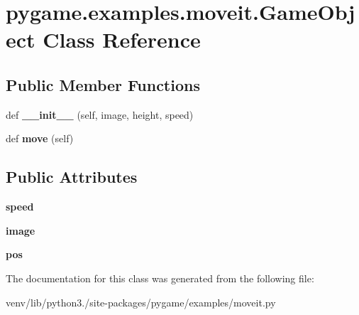 \hypertarget{classpygame_1_1examples_1_1moveit_1_1_game_object}{}\section{pygame.\+examples.\+moveit.\+Game\+Object Class Reference}
\label{classpygame_1_1examples_1_1moveit_1_1_game_object}
\subsection*{Public Member Functions}
\begin{DoxyCompactItemize}
\item 
\mbox{\label{classpygame_1_1examples_1_1moveit_1_1_game_object_a068fddaf4706a94b006340b060223c04}} 
def {\bfseries \+\_\+\+\_\+init\+\_\+\+\_\+} (self, image, height, speed)
\item 
\mbox{\label{classpygame_1_1examples_1_1moveit_1_1_game_object_af06392afb303a7d25b738c8a05c4c67f}} 
def {\bfseries move} (self)
\end{DoxyCompactItemize}
\subsection*{Public Attributes}
\begin{DoxyCompactItemize}
\item 
\mbox{\label{classpygame_1_1examples_1_1moveit_1_1_game_object_a8900c65893e1d0f540e34f8f2be7eef8}} 
{\bfseries speed}
\item 
\mbox{\label{classpygame_1_1examples_1_1moveit_1_1_game_object_af9430fab864761d796f49b51abbab91a}} 
{\bfseries image}
\item 
\mbox{\label{classpygame_1_1examples_1_1moveit_1_1_game_object_a582d76aa811f9fed96e637afbb6394d6}} 
{\bfseries pos}
\end{DoxyCompactItemize}


The documentation for this class was generated from the following file\+:\begin{DoxyCompactItemize}
\item 
venv/lib/python3./site-\/packages/pygame/examples/moveit.\+py\end{DoxyCompactItemize}
